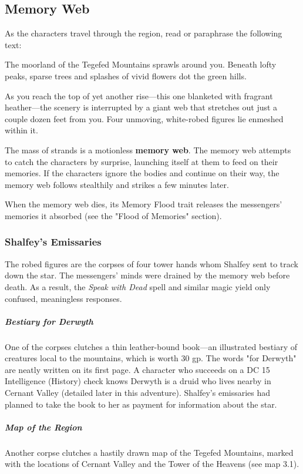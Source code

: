\documentclass[10pt,a4paper,twoside,bg=print,twocolumn,openany,nodeprecatedcode]{dndbook}
\begin{document}
\subsection{Memory Web}
As the characters travel through the region, read or paraphrase the following text:

\begin{DndReadAloud}{}
The moorland of the Tegefed Mountains sprawls around you. Beneath lofty peaks, sparse trees and splashes of vivid flowers dot the green hills.

As you reach the top of yet another rise—this one blanketed with fragrant heather—the scenery is interrupted by a giant web that stretches out just a couple dozen feet from you. Four unmoving, white-robed figures lie enmeshed within it.

\end{DndReadAloud}

The mass of strands is a motionless \textbf{memory web}. The memory web attempts to catch the characters by surprise, launching itself at them to feed on their memories. If the characters ignore the bodies and continue on their way, the memory web follows stealthily and strikes a few minutes later.

When the memory web dies, its Memory Flood trait releases the messengers' memories it absorbed (see the "Flood of Memories" section).

\subsubsection{Shalfey's Emissaries}
The robed figures are the corpses of four tower hands whom Shalfey sent to track down the star. The messengers' minds were drained by the memory web before death. As a result, the \textit{Speak with Dead} spell and similar magic yield only confused, meaningless responses.

\subparagraph{Bestiary for Derwyth}
One of the corpses clutches a thin leather-bound book—an illustrated bestiary of creatures local to the mountains, which is worth 30 gp. The words "for Derwyth" are neatly written on its first page. A character who succeeds on a DC 15 Intelligence (History) check knows Derwyth is a druid who lives nearby in Cernant Valley (detailed later in this adventure). Shalfey's emissaries had planned to take the book to her as payment for information about the star.

\subparagraph{Map of the Region}
Another corpse clutches a hastily drawn map of the Tegefed Mountains, marked with the locations of Cernant Valley and the Tower of the Heavens (see map 3.1).
\end{document}
